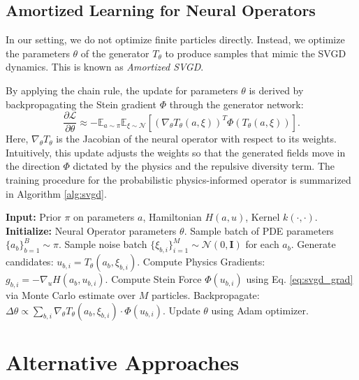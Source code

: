 \documentclass[11pt]{article}
\newcommand{\calN}{\mathcal{N}}
\newcommand{\calL}{\mathcal{L}}
\newcommand{\bbE}{\mathbb{E}}
\begin{document}
\subsection{Amortized Learning for Neural Operators}
In our setting, we do not optimize finite particles directly. Instead, we optimize the parameters $\theta$ of the generator $T_\theta$ to produce samples that mimic the SVGD dynamics. This is known as \textit{Amortized SVGD}.

By applying the chain rule, the update for parameters $\theta$ is derived by backpropagating the Stein gradient $\Phi$ through the generator network:
\begin{equation}
    \frac{\partial \calL}{\partial \theta} \approx -\bbE_{a \sim \pi} \bbE_{\xi \sim \calN} \left[ \left( \nabla_\theta T_\theta(a, \xi) \right)^T \Phi(T_\theta(a, \xi)) \right].
\end{equation}
Here, $\nabla_\theta T_\theta$ is the Jacobian of the neural operator with respect to its weights. Intuitively, this update adjusts the weights so that the generated fields move in the direction $\Phi$ dictated by the physics and the repulsive diversity term. The training procedure for the probabilistic physics-informed operator is summarized in Algorithm \ref{alg:svgd}.

\begin{algorithm}
\caption{Physics-Informed Amortized SVGD}
\label{alg:svgd}
\begin{algorithmic}[1]
\State \textbf{Input:} Prior $\pi$ on parameters $a$, Hamiltonian $H(a,u)$, Kernel $k(\cdot, \cdot)$.
\State \textbf{Initialize:} Neural Operator parameters $\theta$.
    \State Sample batch of PDE parameters $\{a_b\}_{b=1}^B \sim \pi$.
    \State Sample noise batch $\{\xi_{b,i}\}_{i=1}^M \sim \calN(0, \mathbf{I})$ for each $a_b$.
    \State Generate candidates: $u_{b,i} = T_\theta(a_b, \xi_{b,i})$.
    \State Compute Physics Gradients: $g_{b,i} = -\nabla_u H(a_b, u_{b,i})$.
    \State Compute Stein Force $\Phi(u_{b,i})$ using Eq. \eqref{eq:svgd_grad} via Monte Carlo estimate over $M$ particles.
    \State Backpropagate: $\Delta \theta \propto \sum_{b,i} \nabla_\theta T_\theta(a_b, \xi_{b,i}) \cdot \Phi(u_{b,i})$.
    \State Update $\theta$ using Adam optimizer.
\EndWhile
\end{algorithmic}
\end{algorithm}

\section{Alternative Approaches}
\label{sec:alternative_methods}
\end{document}

